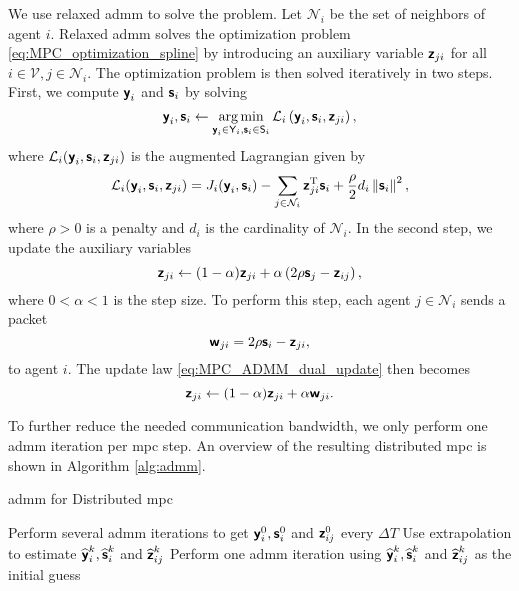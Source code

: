 We use relaxed \gls{admm} \cite{bastianello_asynchronous_2021} to solve the problem.
Let $\mathcal{N}_i$ be the set of neighbors of agent $i$.
Relaxed \gls{admm} solves the optimization problem \eqref{eq:MPC_optimization_spline} by introducing an auxiliary variable $\boldsymbol{\mathsf{z}}_{ji}$ for all $i \in \mathcal{V}, j \in \mathcal{N}_i$.
The optimization problem is then solved iteratively in two steps.
First, we compute $\boldsymbol{\mathsf{y}}_i$ and $\boldsymbol{\mathsf{s}}_i$ by solving
\begin{equation}
    \boldsymbol{\mathsf{y}}_i, \boldsymbol{\mathsf{s}}_i
    \leftarrow
    \operatorname*{arg\,min}_{\boldsymbol{\mathsf{y}}_i \in \mathsf{Y}_i, \boldsymbol{\mathsf{s}}_i \in \mathsf{S}_i}
    \mathcal{L}_i
    \left(
        \boldsymbol{\mathsf{y}}_i, \boldsymbol{\mathsf{s}}_i, \boldsymbol{\mathsf{z}}_{ji}
    \right), \label{eq:MPC_ADMM_primal_update}
\end{equation}
where $\mathcal{L}_i(\boldsymbol{\mathsf{y}}_i, \boldsymbol{\mathsf{s}}_i, \boldsymbol{\mathsf{z}}_{ji})$ is the augmented Lagrangian given by
\begin{equation}
    \mathcal{L}_i(\boldsymbol{\mathsf{y}}_i, \boldsymbol{\mathsf{s}}_i, \boldsymbol{\mathsf{z}}_{ji}) = J_i(\boldsymbol{\mathsf{y}}_i, \boldsymbol{\mathsf{s}}_i) - \sum_{j \in \mathcal{N}_i} \boldsymbol{\mathsf{z}}_{ji}^{\mathrm{T}}\boldsymbol{\mathsf{s}}_i + \frac{\rho}{2}d_i\left\|\boldsymbol{\mathsf{s}}_i\right\|^2,
\end{equation}
where $\rho > 0$ is a penalty and $d_i$ is the cardinality of $\mathcal{N}_i$.
In the second step, we update the auxiliary variables
\begin{equation}
    \boldsymbol{\mathsf{z}}_{ji} \leftarrow (1 - \alpha) \boldsymbol{\mathsf{z}}_{ji} + \alpha \left(2\rho\boldsymbol{\mathsf{s}}_j - \boldsymbol{\mathsf{z}}_{ij}\right), \label{eq:MPC_ADMM_dual_update}
\end{equation}
where $0 < \alpha < 1$ is the step size. To perform this step, each agent $j \in \mathcal{N}_i$ sends a packet
\begin{equation}
    \boldsymbol{\mathsf{w}}_{ji} = 2\rho\boldsymbol{\mathsf{s}}_i - \boldsymbol{\mathsf{z}}_{ji}, \label{eq:MPC_ADMM_packet}
\end{equation}
to agent $i$. The update law \eqref{eq:MPC_ADMM_dual_update} then becomes
\begin{equation}
    \boldsymbol{\mathsf{z}}_{ji} \leftarrow (1 - \alpha) \boldsymbol{\mathsf{z}}_{ji} + \alpha \boldsymbol{\mathsf{w}}_{ji}. \label{eq:MPC_ADMM_dual_update_packet}
\end{equation} 

To further reduce the needed communication bandwidth, we only perform one \gls{admm} iteration per \gls{mpc} step. An overview of the resulting distributed \gls{mpc} is shown in Algorithm \ref{alg:admm}.

\begin{algorithm}[t]
    \caption{\gls{admm} for Distributed \gls{mpc}}\label{alg:admm}
    \begin{algorithmic}[1]
         Perform several \gls{admm} iterations to get $\boldsymbol{\mathsf{y}}_i^0, \boldsymbol{\mathsf{s}}_i^0$ and $\boldsymbol{\mathsf{z}}_{ij}^0$
         every $\Delta T$
            \State Use extrapolation to estimate $\widehat{\boldsymbol{\mathsf{y}}}_i^k, \widehat{\boldsymbol{\mathsf{s}}}_i^k$ and $\widehat{\boldsymbol{\mathsf{z}}}_{ij}^k$
            \State Perform one \gls{admm} iteration using $\widehat{\boldsymbol{\mathsf{y}}}_i^k, \widehat{\boldsymbol{\mathsf{s}}}_i^k$ and $\widehat{\boldsymbol{\mathsf{z}}}_{ij}^k$ as the initial guess
        \EndFor
    \end{algorithmic}
\end{algorithm}



